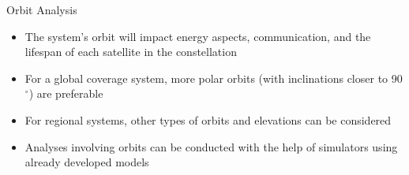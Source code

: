 \begin{frame}{Orbit Analysis}

    \begin{itemize}
        \item The system's orbit will impact energy aspects, communication, and the lifespan of each satellite in the constellation
        \vspace{0.2cm}
        \item For a global coverage system, more polar orbits (with inclinations closer to 90$^{\circ}$) are preferable
        \vspace{0.2cm}
        \item For regional systems, other types of orbits and elevations can be considered
        \vspace{0.2cm}
        \item Analyses involving orbits can be conducted with the help of simulators using already developed models
    \end{itemize}

\end{frame}
